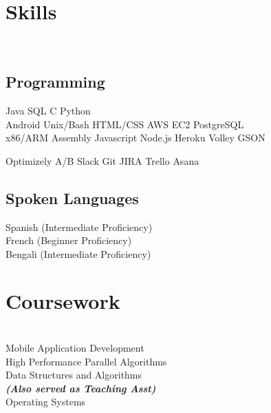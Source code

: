 \documentclass[]{deedy-resume-openfont}
\begin{document}
\begin{minipage}[t]{0.31\textwidth}
\section{Skills}
\\[1\baselineskip]
\subsection{Programming}

Java \textbullet{}  SQL  \textbullet{} C \textbullet{} Python
\\[1\baselineskip]

Android  \textbullet{}  Unix/Bash \textbullet{} HTML/CSS \textbullet{} AWS EC2 \textbullet{} PostgreSQL
\\[1\baselineskip]

x86/ARM Assembly \textbullet{}  Javascript \textbullet{}  Node.js \textbullet{}  Heroku \textbullet{} Volley \textbullet{} GSON
\sectionsep

Optimizely A/B \textbullet{}  Slack \textbullet{}  Git \textbullet{}  JIRA \textbullet{}  Trello \textbullet{}  Asana
\sectionsep

\subsection{Spoken Languages}
Spanish (Intermediate Proficiency) \\
French (Beginner Proficiency)\\
Bengali (Intermediate Proficiency)\\
[1\baselineskip]


\section{Coursework}
\\[1\baselineskip]
Mobile Application Development\\
High Performance Parallel Algorithms \\
Data Structures and Algorithms\\
{\footnotesize \textit{\textbf{(Also served as Teaching Asst) }}} \\
Operating Systems\\
\sectionsep

%
%

\end{minipage} 
\end{document}
